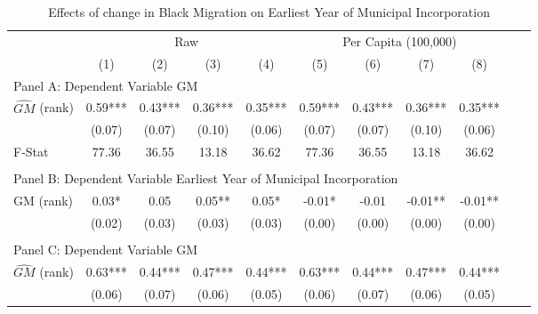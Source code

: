  \begin{table}[htbp]\centering {} \begin{threeparttable} \caption{Effects of change in Black Migration on Earliest Year of Municipal Incorporation} \begin{tabular}{l*{10}{c}} \toprule
                &\multicolumn{4}{c}{Raw}                                    &\multicolumn{4}{c}{Per Capita (100,000)}                   \\\cmidrule(lr){2-5}\cmidrule(lr){6-9}
                &\multicolumn{1}{c}{(1)}   &\multicolumn{1}{c}{(2)}   &\multicolumn{1}{c}{(3)}   &\multicolumn{1}{c}{(4)}   &\multicolumn{1}{c}{(5)}   &\multicolumn{1}{c}{(6)}   &\multicolumn{1}{c}{(7)}   &\multicolumn{1}{c}{(8)}   \\
\cmidrule(lr){1-9}
\multicolumn{8}{l}{Panel A: Dependent Variable GM}\\
\cmidrule(lr){1-9}
$\hat{GM}$ (rank)&       0.59***&       0.43***&       0.36***&       0.35***&       0.59***&       0.43***&       0.36***&       0.35***\\
                &     (0.07)   &     (0.07)   &     (0.10)   &     (0.06)   &     (0.07)   &     (0.07)   &     (0.10)   &     (0.06)   \\
\midrule
F-Stat          &      77.36   &      36.55   &      13.18   &      36.62   &      77.36   &      36.55   &      13.18   &      36.62   \\
\cmidrule[\heavyrulewidth](lr){1-9} \\ \cmidrule[\heavyrulewidth](lr){1-9}
\multicolumn{8}{l}{Panel B: Dependent Variable Earliest Year of Municipal Incorporation}\\
\cmidrule(lr){1-9}
GM  (rank)      &       0.03*  &       0.05   &       0.05** &       0.05*  &      -0.01*  &      -0.01   &      -0.01** &      -0.01** \\
                &     (0.02)   &     (0.03)   &     (0.03)   &     (0.03)   &     (0.00)   &     (0.00)   &     (0.00)   &     (0.00)   \\
\cmidrule[\heavyrulewidth](lr){1-9} \\ \cmidrule[\heavyrulewidth](lr){1-9}
\multicolumn{8}{l}{Panel C: Dependent Variable GM}\\
\cmidrule(lr){1-9}
$\hat{GM}$ (rank)&       0.63***&       0.44***&       0.47***&       0.44***&       0.63***&       0.44***&       0.47***&       0.44***\\
                &     (0.06)   &     (0.07)   &     (0.06)   &     (0.05)   &     (0.06)   &     (0.07)   &     (0.06)   &     (0.05)   \\

\end{tabular}
\end{threeparttable}
\end{table}
